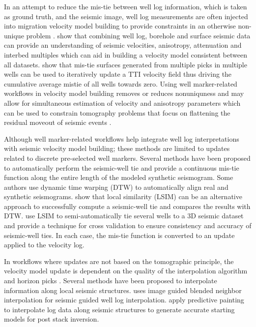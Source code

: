 In an attempt to reduce the mis-tie between well log information, which is taken as ground truth, and the seismic image, well log measurements are often injected into migration velocity model building to provide constraints in an otherwise non-unique problem \cite[]{bakulin2010localized}. \cite{morice2004well} show that combining well log, borehole and surface seismic data can provide an understanding of seismic velocities, anisotropy, attenuation and interbed multiples which can aid in building a velocity model consistent between all datasets. \cite{egozi2006comprehensive} show that mis-tie surfaces generated from multiple picks in multiple wells can be used to iteratively update a TTI velocity field thus driving the cumulative average mistie of all wells towards zero. Using well marker-related workflows in velocity model building removes or reduces nonuniquness and may allow for simultaneous estimation of velocity and anisotropy parameters which can be used to constrain tomography problems that focus on flattening the residual moveout of seismic events \cite[]{woodward2008decade,bakulin2010localized}.

Although well marker-related workflows help integrate well log interpretations with seismic velocity model building; these methods are limited to updates related to discrete pre-selected well markers. Several methods have been proposed to automatically perform the seismic-well tie and provide a continuous mis-tie function along the entire length of the modeled synthetic seismogram. Some authors \cite[]{munozhale2012,wu2016simultaneous} use dynamic time warping (DTW) \cite[]{berndt1994using,hale2013} to automatically align real and synthetic seismograms. \cite{herrerab} show that local similarity (LSIM) \cite[]{fomel2007local} can be an alternative approach to successfully compute a seismic-well tie and compares the results with DTW. \cite{bader2018interp} use LSIM to semi-automatically tie several wells to a 3D seismic dataset and provide a technique for cross validation to ensure consistency and accuracy of seismic-well ties. In each case, the mis-tie function is converted to an update applied to the velocity log.

In workflows where updates are not based on the tomographic principle, the velocity model update is dependent on the quality of the interpolation algorithm and horizon picks \cite[]{gupta2013well}. Several methods have been proposed to interpolate information along local seismic structures. \cite{hale2010image} uses image guided blended neighbor interpolation \cite[]{hale2009image} for seismic guided well log interpolation. \cite{karimi2017creating} apply predictive painting \cite[]{fomel2010predictive} to interpolate log data along seismic structures to generate accurate starting models for post stack inversion.

